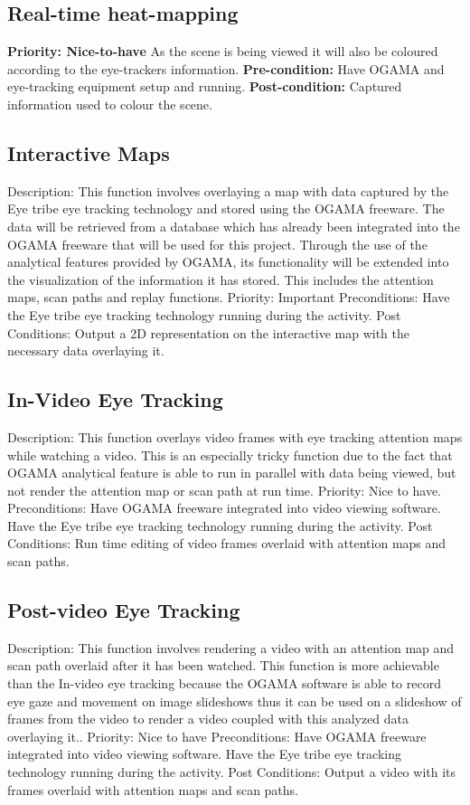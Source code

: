 \subsection{Real-time heat-mapping}
    \textbf{Priority: Nice-to-have}\newline
    As the scene is being viewed it will also be coloured according to the eye-trackers information.\newline
    \textbf{Pre-condition: }
    Have OGAMA and eye-tracking equipment setup and running.\newline
    \textbf{Post-condition: }
    Captured information used to colour the scene.
\subsection{Interactive Maps}
Description: This function involves overlaying a map with data captured by the Eye tribe eye tracking technology and stored using the OGAMA freeware. The data will be retrieved from a database which has already been integrated into the OGAMA freeware that will be used for this project. Through the use of the analytical features provided by OGAMA, its functionality will be extended into the visualization of the information it has stored. This includes the attention maps, scan paths and replay functions.
Priority: Important
Preconditions: Have the Eye tribe eye tracking technology running during the activity.     
Post Conditions: Output a 2D representation on the interactive map with the necessary data overlaying it. 
\subsection{In-Video Eye Tracking}
Description:  This function overlays video frames with eye tracking attention maps while watching a video. This is an especially tricky function due to the fact that OGAMA analytical feature is able to run in parallel with data being viewed, but not render the attention map or scan path at run time.
Priority: Nice to have.
Preconditions: Have OGAMA freeware integrated into video viewing software. Have the Eye tribe eye tracking technology running during the activity.
Post Conditions: Run time editing of video frames overlaid with attention maps and scan paths.
\subsection{Post-video Eye Tracking}
Description: This function involves rendering a video with an attention map and scan path overlaid after it has been watched. This function is more achievable than the In-video eye tracking because the OGAMA software is able to record eye gaze and movement on image slideshows thus it can be used on a slideshow of frames from the video to render a video coupled with this analyzed data overlaying it..  
Priority: Nice to have
Preconditions: Have OGAMA freeware integrated into video viewing software. Have the Eye tribe eye tracking technology running during the activity.    
Post Conditions: Output a video with its frames overlaid with attention maps and scan paths.

